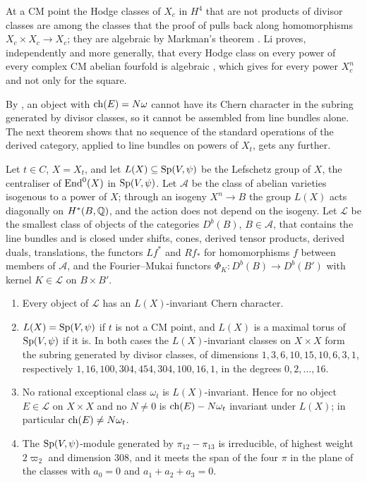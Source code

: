 At a CM point the Hodge classes of $X_{c}$ in $H^{4}$ that are not products
of divisor classes are among the classes that the proof of
 pulls back along homomorphisms $X_{c}\times X_{c}\to
X_{c}$; they are algebraic by Markman's theorem \cite{Mar25a}. Li proves,
independently and more generally, that every Hodge class on every power of
every complex CM abelian fourfold is algebraic \cite[Theorem~1.3]{Li26}, which
gives  for every power $X_{c}^{n}$ and not only for the
square.

By , an object with $\operatorname{ch}(E)=N\omega$ cannot have
its Chern character in the subring generated by divisor classes, so it cannot
be assembled from line bundles alone. The next theorem shows that no sequence
of the standard operations of the derived category, applied to line bundles
on powers of $X_{t}$, gets any further.

\begin{theorem}\label{thm:lefschetzclosure}
Let $t\in C$, $X=X_{t}$, and let $L(X)\subseteq\operatorname{Sp}(V,\psi)$ be the Lefschetz
group of $X$, the centraliser of $\operatorname{End}^{0}(X)$ in $\operatorname{Sp}(V,\psi)$. Let
$\mathcal{A}$ be the class of abelian varieties isogenous to a power of $X$;
through an isogeny $X^{n}\to B$ the group $L(X)$ acts diagonally on
$H^{*}(B,\mathbb{Q})$, and the action does not depend on the isogeny. Let
$\mathcal{L}$ be the smallest class of objects of the categories
$D^{b}(B)$, $B\in\mathcal{A}$, that contains the line bundles and is closed
under shifts, cones, derived tensor products, derived duals, translations,
the functors $Lf^{*}$ and $Rf_{*}$ for homomorphisms $f$ between members of
$\mathcal{A}$, and the Fourier--Mukai functors $\Phi_{K}\colon D^{b}(B)\to
D^{b}(B')$ with kernel $K\in\mathcal{L}$ on $B\times B'$.
\begin{enumerate}[label=\textup{(\roman*)},leftmargin=2.6em,itemsep=2pt]
\item Every object of $\mathcal{L}$ has an $L(X)$-invariant Chern character.
\item $L(X)=\operatorname{Sp}(V,\psi)$ if $t$ is not a CM point, and $L(X)$ is a maximal
  torus of $\operatorname{Sp}(V,\psi)$ if it is. In both cases the $L(X)$-invariant classes
  on $X\times X$ form the subring generated by divisor classes, of dimensions
  $1,3,6,10,15,10,6,3,1$, respectively $1,16,100,304,454,304,100,16,1$, in
  the degrees $0,2,\dots,16$.
\item No rational exceptional class $\omega_{t}$ is $L(X)$-invariant. Hence
  for no object $E\in\mathcal{L}$ on $X\times X$ and no $N\ne0$ is
  $\operatorname{ch}(E)-N\omega_{t}$ invariant under $L(X)$; in particular
  $\operatorname{ch}(E)\ne N\omega_{t}$.
\item The $\operatorname{Sp}(V,\psi)$-module generated by $\pi_{12}-\pi_{13}$ is
  irreducible, of highest weight $2\varpi_{2}$ and dimension $308$, and it
  meets the span of the four $\pi$ in the plane of the classes with
  $a_{0}=0$ and $a_{1}+a_{2}+a_{3}=0$.
\end{enumerate}
\end{theorem}

